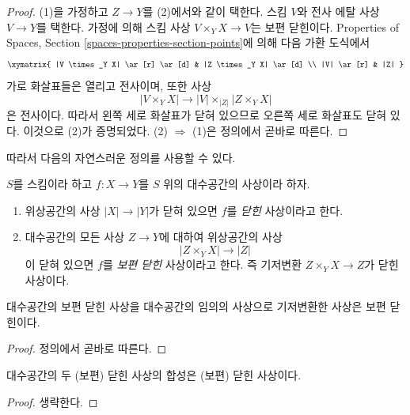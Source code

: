 \begin{proof}
(1)을 가정하고 $Z \to Y$를 (2)에서와 같이 택한다.
스킴 $V$와 전사 에탈 사상 $V \to Y$를 택한다.
가정에 의해 스킴 사상 $V \times_Y X \to V$는 보편 닫힌이다.
Properties of Spaces, Section \ref{spaces-properties-section-points}에 의해
다음 가환 도식에서
$$
\xymatrix{
|V \times_Y X| \ar[r] \ar[d] & |Z \times_Y X| \ar[d] \\
|V| \ar[r] & |Z|
}
$$
가로 화살표들은 열리고 전사이며, 또한 사상
$$
|V \times_Y X| \longrightarrow |V| \times_{|Z|} |Z \times_Y X|
$$
은 전사이다. 따라서 왼쪽 세로 화살표가 닫혀 있으므로 오른쪽 세로
화살표도 닫혀 있다. 이것으로 (2)가 증명되었다.
(2) $\Rightarrow$ (1)은 정의에서 곧바로 따른다.
\end{proof}

\noindent
따라서 다음의 자연스러운 정의를 사용할 수 있다.

\begin{definition}
\label{definition-closed}
$S$를 스킴이라 하고 $f : X \to Y$를 $S$ 위의 대수공간의 사상이라 하자.
\begin{enumerate}
\item 위상공간의 사상 $|X| \to |Y|$가 닫혀 있으면
$f$를 {\it 닫힌} 사상이라고 한다.
\item 대수공간의 모든 사상 $Z \to Y$에 대하여 위상공간의 사상
$$
|Z \times_Y X| \to |Z|
$$
이 닫혀 있으면 $f$를 {\it 보편 닫힌} 사상이라고 한다.
즉 기저변환 $Z \times_Y X \to Z$가 닫힌 사상이다.
\end{enumerate}
\end{definition}

\begin{lemma}
\label{lemma-base-change-universally-closed}
대수공간의 보편 닫힌 사상을 대수공간의 임의의 사상으로 기저변환한
사상은 보편 닫힌이다.
\end{lemma}

\begin{proof}
정의에서 곧바로 따른다.
\end{proof}

\begin{lemma}
\label{lemma-composition-universally-closed}
대수공간의 두 (보편) 닫힌 사상의 합성은 (보편) 닫힌 사상이다.
\end{lemma}

\begin{proof}
생략한다.
\end{proof}

